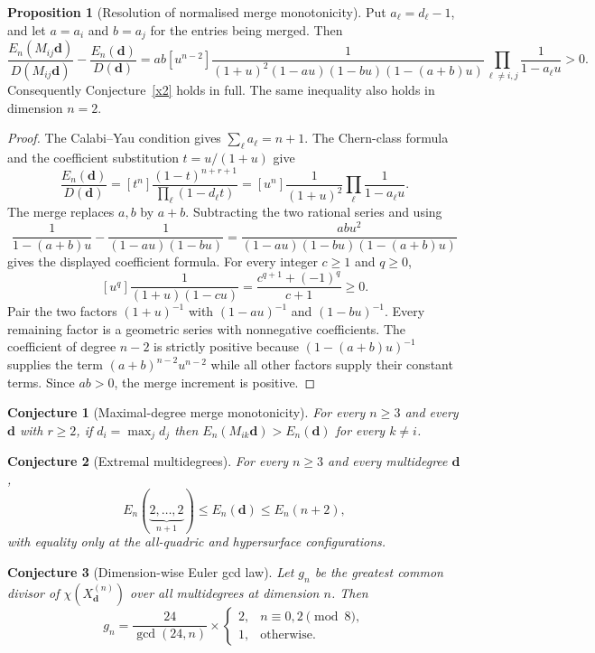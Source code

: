 \documentclass[11pt]{article}
\newtheorem{conjecture}{Conjecture}
\theoremstyle{definition}
\newtheorem{proposition}{Proposition}
\begin{document}
\begin{proposition}[Resolution of normalised merge monotonicity]\label{x:merge}
Put $a_\ell=d_\ell-1$, and let $a=a_i$ and $b=a_j$ for the entries being merged.  Then
\[
\frac{E_n(M_{ij}\mathbf d)}{D(M_{ij}\mathbf d)}-
\frac{E_n(\mathbf d)}{D(\mathbf d)}
=ab[u^{n-2}]\frac{1}{(1+u)^2(1-au)(1-bu)(1-(a+b)u)}
\prod_{\ell\ne i,j}\frac{1}{1-a_\ell u}>0.
\]
Consequently Conjecture~\ref{x2} holds in full.  The same inequality also holds in dimension $n=2$.
\end{proposition}

\begin{proof}
The Calabi--Yau condition gives $\sum_\ell a_\ell=n+1$.  The Chern-class formula and the coefficient substitution $t=u/(1+u)$ give
\[
\frac{E_n(\mathbf d)}{D(\mathbf d)}
=[t^n]\frac{(1-t)^{n+r+1}}{\prod_\ell(1-d_\ell t)}
=[u^n]\frac{1}{(1+u)^2}\prod_\ell\frac{1}{1-a_\ell u}.
\]
The merge replaces $a,b$ by $a+b$.  Subtracting the two rational series and using
\[
\frac{1}{1-(a+b)u}-\frac{1}{(1-au)(1-bu)}
=\frac{ab u^2}{(1-au)(1-bu)(1-(a+b)u)}
\]
gives the displayed coefficient formula.  For every integer $c\ge1$ and $q\ge0$,
\[
[u^q]\frac{1}{(1+u)(1-cu)}=\frac{c^{q+1}+(-1)^q}{c+1}\ge0.
\]
Pair the two factors $(1+u)^{-1}$ with $(1-au)^{-1}$ and $(1-bu)^{-1}$.  Every remaining factor is a geometric series with nonnegative coefficients.  The coefficient of degree $n-2$ is strictly positive because $(1-(a+b)u)^{-1}$ supplies the term $(a+b)^{n-2}u^{n-2}$ while all other factors supply their constant terms.  Since $ab>0$, the merge increment is positive.
\end{proof}

\begin{conjecture}[Maximal-degree merge monotonicity]\label{x3}
For every $n\ge3$ and every $\mathbf d$ with $r\ge2$, if $d_i=\max_jd_j$ then $E_n(M_{ik}\mathbf d)>E_n(\mathbf d)$ for every $k\ne i$.
\end{conjecture}

\begin{conjecture}[Extremal multidegrees]\label{x4}
For every $n\ge3$ and every multidegree $\mathbf d$,
\[
E_n(\underbrace{2,\ldots,2}_{n+1})\le E_n(\mathbf d)\le E_n(n+2),
\]
with equality only at the all-quadric and hypersurface configurations.
\end{conjecture}

\begin{conjecture}[Dimension-wise Euler gcd law]\label{x5}
Let $g_n$ be the greatest common divisor of $\chi(X^{(n)}_{\mathbf d})$ over all multidegrees at dimension $n$.  Then
\[
g_n=\frac{24}{\gcd(24,n)}\times
\begin{cases}
2,&n\equiv0,2\pmod8,\\
1,&\text{otherwise}.
\end{cases}
\]
\end{conjecture}
\end{document}
